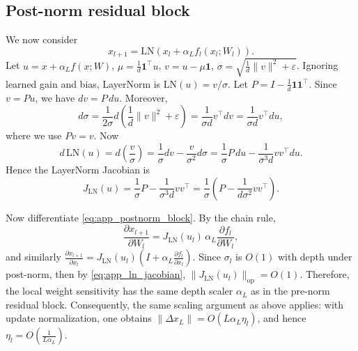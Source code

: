 \documentclass{article}
\begin{document}
\subsection{Post-norm residual block}

We now consider
\begin{equation}
x_{l+1}
=
\mathrm{LN}\!\left(x_l+\alpha_L f_l(x_l;W_l)\right).
\label{eq:app_postnorm_block}
\end{equation}
Let
$u = x + \alpha_L f(x;W)$, $\mu = \frac{1}{d}\mathbf 1^\top u$, $v = u-\mu \mathbf 1$, $\sigma = \sqrt{\frac{1}{d}\|v\|^2+\varepsilon}$.
Ignoring learned gain and bias, LayerNorm is $\mathrm{LN}(u)=v/\sigma$.
Let $P = I - \frac{1}{d}\mathbf 1 \mathbf 1^\top$. Since $v=Pu$, we have $dv = P\,du$. Moreover,
\begin{equation}
d\sigma
=
\frac{1}{2\sigma}d\!\left(\frac{1}{d}\|v\|^2+\varepsilon\right)
=
\frac{1}{\sigma d} v^\top dv
=
\frac{1}{\sigma d}v^\top du,
\end{equation}
where we use $Pv=v$. Now
\begin{equation}
d\,\mathrm{LN}(u)
=
d\left(\frac{v}{\sigma}\right)
=
\frac{1}{\sigma}dv - \frac{v}{\sigma^2}d\sigma
=
\frac{1}{\sigma}P\,du
-
\frac{1}{\sigma^3 d} vv^\top du.
\end{equation}
Hence the LayerNorm Jacobian is
\begin{equation}
J_{\mathrm{LN}}(u)
=
\frac{1}{\sigma}P - \frac{1}{\sigma^3 d}vv^\top
=
\frac{1}{\sigma}\left(P-\frac{1}{d\sigma^2}vv^\top\right).
\label{eq:app_ln_jacobian}
\end{equation}

Now differentiate \eqref{eq:app_postnorm_block}. By the chain rule,
\begin{equation}
\frac{\partial x_{l+1}}{\partial W_l}
=
J_{\mathrm{LN}}(u_l)\,\alpha_L \frac{\partial f_l}{\partial W_l},
\end{equation}
and similarly
$
\frac{\partial x_{l+1}}{\partial x_l}
=
J_{\mathrm{LN}}(u_l)\left(I+\alpha_L \frac{\partial f_l}{\partial x_l}\right).
$
Since $\sigma_l$ is $O(1)$ with depth under post-norm, then by \eqref{eq:app_ln_jacobian},
$\|J_{\mathrm{LN}}(u_l)\|_{\mathrm{op}} = O(1)$.
Therefore, the local weight sensitivity has the same depth scaler $\alpha_L$ as in the pre-norm residual block. Consequently, the same scaling argument as above applies: with update normalization, one obtains
$\|\Delta x_L\| = O(L\alpha_L \eta_l)$,
and hence $\eta_l = O\!\left(\frac{1}{L\alpha_L}\right)$.

\end{document}
